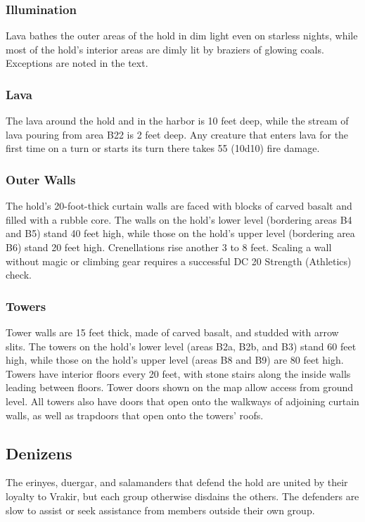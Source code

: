 \documentclass[10pt,a4paper,twoside,bg=print,twocolumn,openany,nodeprecatedcode]{dndbook}
\begin{document}
\subsubsection{Illumination}
Lava bathes the outer areas of the hold in dim light even on starless nights, while most of the hold's interior areas are dimly lit by braziers of glowing coals. Exceptions are noted in the text.

\subsubsection{Lava}
The lava around the hold and in the harbor is 10 feet deep, while the stream of lava pouring from area B22 is 2 feet deep. Any creature that enters lava for the first time on a turn or starts its turn there takes 55 (10d10) fire damage.

\subsubsection{Outer Walls}
The hold's 20-foot-thick curtain walls are faced with blocks of carved basalt and filled with a rubble core. The walls on the hold's lower level (bordering areas B4 and B5) stand 40 feet high, while those on the hold's upper level (bordering area B6) stand 20 feet high. Crenellations rise another 3 to 8 feet. Scaling a wall without magic or climbing gear requires a successful DC 20 Strength (Athletics) check.

\subsubsection{Towers}
Tower walls are 15 feet thick, made of carved basalt, and studded with arrow slits. The towers on the hold's lower level (areas B2a, B2b, and B3) stand 60 feet high, while those on the hold's upper level (areas B8 and B9) are 80 feet high. Towers have interior floors every 20 feet, with stone stairs along the inside walls leading between floors. Tower doors shown on the map allow access from ground level. All towers also have doors that open onto the walkways of adjoining curtain walls, as well as trapdoors that open onto the towers' roofs.

\subsection{Denizens}
The erinyes, duergar, and salamanders that defend the hold are united by their loyalty to Vrakir, but each group otherwise disdains the others. The defenders are slow to assist or seek assistance from members outside their own group.
\end{document}

